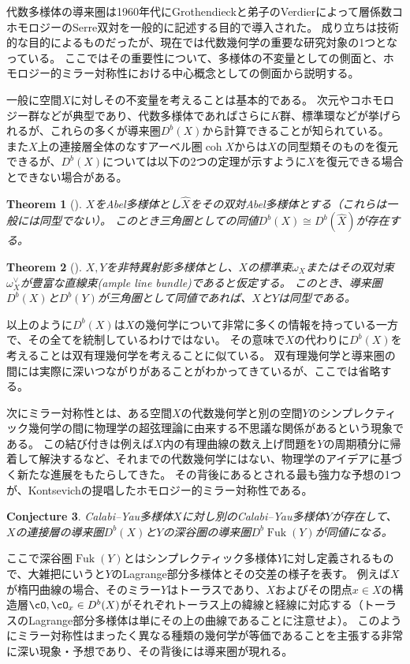 \documentclass[uplatex,a4paper,dvipdfmx]{jsarticle}
\theoremstyle{plain}
\newtheorem{theorem}{Theorem}[section]
\newtheorem{conjecture}[theorem]{Conjecture}
\theoremstyle{definition}
\DeclareMathOperator{\coh}{\mathrm{coh}}
\DeclareMathOperator{\Fuk}{Fuk}
\begin{document}
代数多様体の導来圏は1960年代にGrothendieckと弟子のVerdierによって層係数コホモロジーのSerre双対を一般的に記述する目的で導入された。
成り立ちは技術的な目的によるものだったが、現在では代数幾何学の重要な研究対象の1つとなっている。
ここではその重要性について、多様体の不変量としての側面と、ホモロジー的ミラー対称性における中心概念としての側面から説明する。

一般に空間$X$に対しその不変量を考えることは基本的である。
次元やコホモロジー群などが典型であり、代数多様体であればさらに$K$群、標準環などが挙げられるが、これらの多くが導来圏$D^b(X)$から計算できることが知られている。
また$X$上の連接層全体のなすアーベル圏$\coh X$からは$X$の同型類そのものを復元できるが、$D^b(X)$については以下の2つの定理が示すように$X$を復元できる場合とできない場合がある。
\begin{theorem}[\cite{MR607081}]
	$X$をAbel多様体とし$\hat{X}$をその双対Abel多様体とする（これらは一般には同型でない）。
	このとき三角圏としての同値$D^b(X) \cong D^b(\hat{X})$が存在する。
\end{theorem}
\begin{theorem}[\cite{MR1818984}]
	$X, Y$を非特異射影多様体とし、$X$の標準束$\omega_X$またはその双対束$\omega_X^\vee$が豊富な直線束(ample line bundle)であると仮定する。
	このとき、導来圏$D^b(X)$と$D^b(Y)$が三角圏として同値であれば、$X$と$Y$は同型である。
\end{theorem}
以上のように$D^b(X)$は$X$の幾何学について非常に多くの情報を持っている一方で、その全てを統制しているわけではない。
その意味で$X$の代わりに$D^b(X)$を考えることは双有理幾何学を考えることに似ている。
双有理幾何学と導来圏の間には実際に深いつながりがあることがわかってきているが、ここでは省略する。


次にミラー対称性とは、ある空間$X$の代数幾何学と別の空間$Y$のシンプレクティック幾何学の間に物理学の超弦理論に由来する不思議な関係があるという現象である。
この結び付きは例えば$X$内の有理曲線の数え上げ問題を$Y$の周期積分に帰着して解決するなど、それまでの代数幾何学にはない、物理学のアイデアに基づく新たな進展をもたらしてきた。
その背後にあるとされる最も強力な予想の1つが、Kontsevichの提唱したホモロジー的ミラー対称性である。
\begin{conjecture}
	Calabi--Yau多様体$X$に対し別のCalabi--Yau多様体$Y$が存在して、$X$の連接層の導来圏$D^b (X)$と$Y$の深谷圏の導来圏$D^b \Fuk(Y)$が同値になる。
\end{conjecture}
ここで深谷圏$\Fuk(Y)$とはシンプレクティック多様体$Y$に対し定義されるもので、大雑把にいうと$Y$のLagrange部分多様体とその交差の様子を表す。
例えば$X$が楕円曲線の場合、そのミラー$Y$はトーラスであり、$X$およびその閉点$x \in X$の構造層$\cO, \cO_x \in D^b(X)$がそれぞれトーラス上の緯線と経線に対応する（トーラスのLagrange部分多様体は単にその上の曲線であることに注意せよ）。
このようにミラー対称性はまったく異なる種類の幾何学が等価であることを主張する非常に深い現象・予想であり、その背後には導来圏が現れる。
\end{document}
